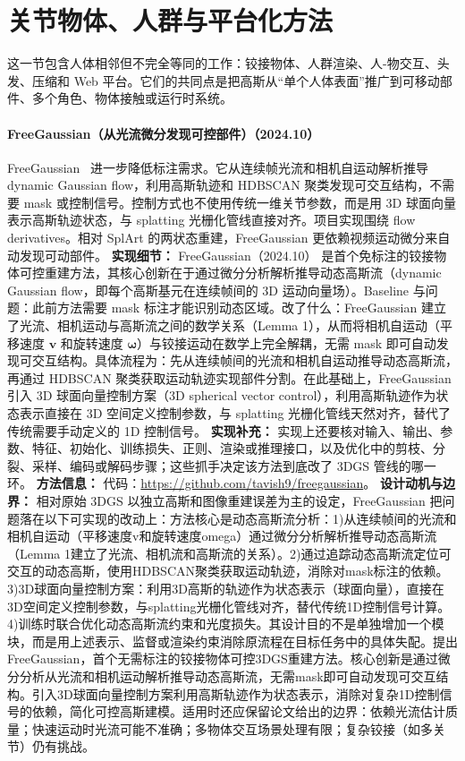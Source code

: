 \section{关节物体、人群与平台化方法}

这一节包含人体相邻但不完全等同的工作：铰接物体、人群渲染、人-物交互、头发、压缩和 Web 平台。它们的共同点是把高斯从“单个人体表面”推广到可移动部件、多个角色、物体接触或运行时系统。
\paragraph{FreeGaussian（从光流微分发现可控部件）（2024.10）}
FreeGaussian~\cite{2410_22070} 进一步降低标注需求。它从连续帧光流和相机自运动解析推导 dynamic Gaussian flow，利用高斯轨迹和 HDBSCAN 聚类发现可交互结构，不需要 mask 或控制信号。控制方式也不使用传统一维关节参数，而是用 3D 球面向量表示高斯轨迹状态，与 splatting 光栅化管线直接对齐。项目实现围绕 flow derivatives。相对 SplArt 的两状态重建，FreeGaussian 更依赖视频运动微分来自动发现可动部件。
\textbf{实现细节：} FreeGaussian（2024.10） 是首个免标注的铰接物体可控重建方法，其核心创新在于通过微分分析解析推导动态高斯流（dynamic Gaussian flow，即每个高斯基元在连续帧间的 3D 运动向量场）。Baseline 与问题：此前方法需要 mask 标注才能识别动态区域。改了什么：FreeGaussian 建立了光流、相机运动与高斯流之间的数学关系（Lemma 1），从而将相机自运动（平移速度 $\mathbf{v}$ 和旋转速度 $\boldsymbol{\omega}$）与铰接运动在数学上完全解耦，无需 mask 即可自动发现可交互结构。具体流程为：先从连续帧间的光流和相机自运动推导动态高斯流，再通过 HDBSCAN 聚类获取运动轨迹实现部件分割。在此基础上，FreeGaussian 引入 3D 球面向量控制方案（3D spherical vector control），利用高斯轨迹作为状态表示直接在 3D 空间定义控制参数，与 splatting 光栅化管线天然对齐，替代了传统需要手动定义的 1D 控制信号。
\textbf{实现补充：} 实现上还要核对输入、输出、参数、特征、初始化、训练损失、正则、渲染或推理接口，以及优化中的剪枝、分裂、采样、编码或解码步骤；这些抓手决定该方法到底改了 3DGS 管线的哪一环。
\textbf{方法信息：} 代码：\url{https://github.com/tavish9/freegaussian}。
\textbf{设计动机与边界：} 相对原始 3DGS 以独立高斯和图像重建误差为主的设定，FreeGaussian 把问题落在以下可实现的改动上：方法核心是动态高斯流分析：1)从连续帧间的光流和相机自运动（平移速度v和旋转速度omega）通过微分分析解析推导动态高斯流（Lemma 1建立了光流、相机流和高斯流的关系）。2)通过追踪动态高斯流定位可交互的动态高斯，使用HDBSCAN聚类获取运动轨迹，消除对mask标注的依赖。3)3D球面向量控制方案：利用3D高斯的轨迹作为状态表示（球面向量），直接在3D空间定义控制参数，与splatting光栅化管线对齐，替代传统1D控制信号计算。4)训练时联合优化动态高斯流约束和光度损失。其设计目的不是单独增加一个模块，而是用上述表示、监督或渲染约束消除原流程在目标任务中的具体失配。提出FreeGaussian，首个无需标注的铰接物体可控3DGS重建方法。核心创新是通过微分分析从光流和相机运动解析推导动态高斯流，无需mask即可自动发现可交互结构。引入3D球面向量控制方案利用高斯轨迹作为状态表示，消除对复杂1D控制信号的依赖，简化可控高斯建模。适用时还应保留论文给出的边界：依赖光流估计质量；快速运动时光流可能不准确；多物体交互场景处理有限；复杂铰接（如多关节）仍有挑战。
